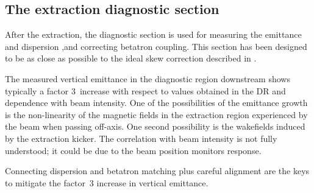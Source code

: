 {{\subsection{The extraction diagnostic section}
After the extraction, the diagnostic section is used for measuring the emittance and dispersion ,and correcting betatron coupling. This section has been designed to be as close as possible to the ideal skew correction described in \cite{Woodley:453645}.\par
The measured vertical emittance in the diagnostic region downstream shows typically a factor 3~increase with respect to values obtained in the DR and dependence with beam intensity. One of the possibilities of the emittance growth is the non-linearity of the magnetic fields in the extraction region experienced by the beam when passing off-axis. One second possibility is the wakefields induced by the extraction kicker. The correlation with beam intensity is not fully understood; it could be due to the beam position monitors response.\par
Connecting dispersion and betatron matching plus careful alignment are the keys to mitigate the factor~3 increase in vertical emittance.\par
}}
